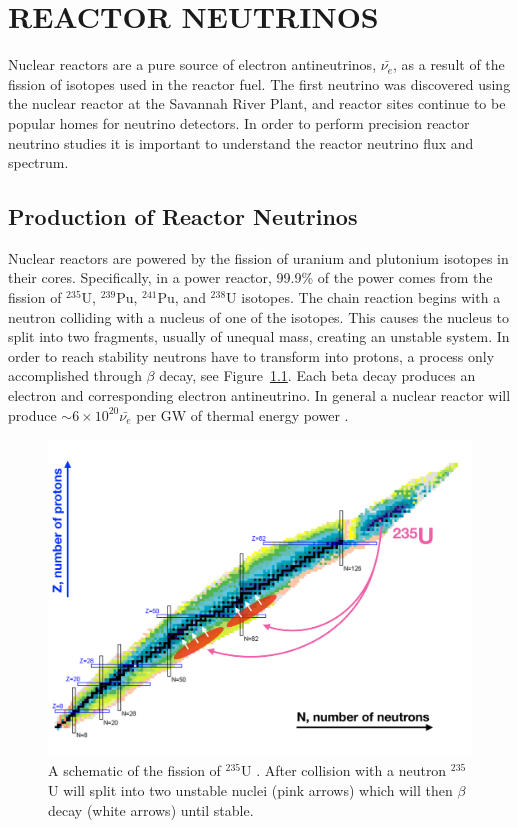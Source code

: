 \chapter{\uppercase{Reactor Neutrinos}}

Nuclear reactors are a pure source of electron antineutrinos, $\bar{\nu_e}$, as a result of the fission of isotopes used in the reactor fuel. The first neutrino was discovered using the nuclear reactor at the Savannah River Plant, and reactor sites continue to be popular homes for neutrino detectors. 
In order to perform precision reactor neutrino studies it is important to understand the reactor neutrino flux and spectrum.

\section{Production of Reactor Neutrinos}

Nuclear reactors are powered by the fission of uranium and plutonium isotopes in their cores. 
Specifically, in a power reactor, 99.9\% of the power comes from the fission of $^{235}$U, $^{239}$Pu, $^{241}$Pu, and $^{238}$U isotopes. 
The chain reaction begins with a neutron colliding with a nucleus of one of the isotopes. 
This causes the nucleus to split into two fragments, usually of unequal mass, creating an unstable system.
In order to reach stability neutrons have to transform into protons, a process only accomplished through $\beta$ decay, see Figure~\ref{fig:nucchart}.
Each beta decay produces an electron and corresponding electron antineutrino. 
In general a nuclear reactor will produce $\sim 6 \times 10^{20} \bar{\nu_e}$ per GW of thermal energy power \cite{HayesVogel}.

\begin{figure}[h]
	\centering
	\includegraphics[width=0.7\linewidth]{tex/3-reactorneutrinos-images/NuclideChart_U235}
	\caption{A schematic of the fission of $^{235}$U \cite{NucChart}. After collision with a neutron $^{235}$U will split into two unstable nuclei (pink arrows) which will then $\beta$ decay (white arrows) until stable.}
	\label{fig:nucchart}
\end{figure}


